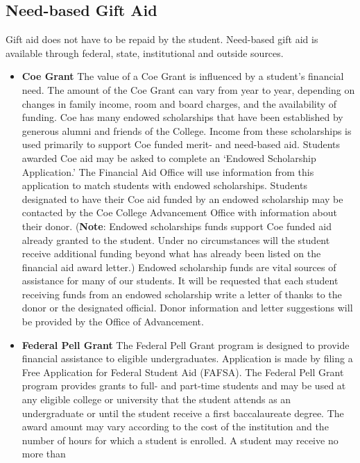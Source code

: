 \documentclass[
  letterpaper,
]{scrbook}
\begin{document}
\subsection{Need-based Gift Aid}\label{need-based-gift-aid}

Gift aid does not have to be repaid by the student. Need-based gift aid
is available through federal, state, institutional and outside sources.

\begin{itemize}
\item
  \textbf{Coe Grant} The value of a Coe Grant is influenced by a
  student's financial need. The amount of the Coe Grant can vary from
  year to year, depending on changes in family income, room and board
  charges, and the availability of funding. Coe has many endowed
  scholarships that have been established by generous alumni and friends
  of the College. Income from these scholarships is used primarily to
  support Coe funded merit- and need-based aid. Students awarded Coe aid
  may be asked to complete an `Endowed Scholarship Application.' The
  Financial Aid Office will use information from this application to
  match students with endowed scholarships. Students designated to have
  their Coe aid funded by an endowed scholarship may be contacted by the
  Coe College Advancement Office with information about their donor.
  (\textbf{Note}: Endowed scholarships funds support Coe funded aid
  already granted to the student. Under no circumstances will the
  student receive additional funding beyond what has already been listed
  on the financial aid award letter.) Endowed scholarship funds are
  vital sources of assistance for many of our students. It will be
  requested that each student receiving funds from an endowed
  scholarship write a letter of thanks to the donor or the designated
  official. Donor information and letter suggestions will be provided by
  the Office of Advancement.
\item
  \textbf{Federal Pell Grant} The Federal Pell Grant program is designed
  to provide financial assistance to eligible undergraduates.
  Application is made by filing a Free Application for Federal Student
  Aid (FAFSA). The Federal Pell Grant program provides grants to full-
  and part-time students and may be used at any eligible college or
  university that the student attends as an undergraduate or until the
  student receive a first baccalaureate degree. The award amount may
  vary according to the cost of the institution and the number of hours
  for which a student is enrolled. A student may receive no more than

\end{itemize}
\end{document}
